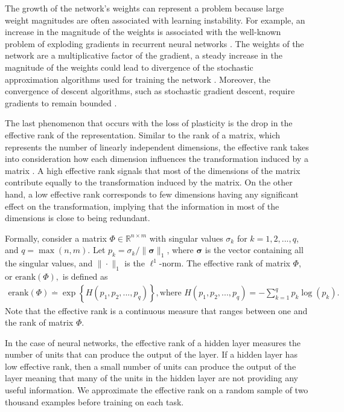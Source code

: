 \documentclass[review, number,3p]{elsarticle}
\newcommand{\custcitealp}[1]{\cite{#1}}
\begin{document}
The growth of the network's weights can represent a problem because large weight magnitudes are often associated with learning instability.
For example, an increase in the magnitude of the weights is associated with the well-known problem of exploding gradients in recurrent neural networks \custcitealp{pascanu2013difficulty}.
The weights of the network are a multiplicative factor of the gradient, a steady increase in the magnitude of the weights could lead to divergence of the stochastic approximation algorithms used for training the network \cite{philipp2017exploding, philipp2018gradients}.
Moreover, the convergence of descent algorithms, such as stochastic gradient descent, require gradients to remain bounded \cite{bertsekas2016}.


The last phenomenon that occurs with the loss of plasticity is the drop in the effective rank of the representation.
Similar to the rank of a matrix, which represents the number of linearly independent dimensions, the effective rank takes into consideration how each dimension influences the transformation induced by a matrix \cite{2007OlivierEffectiveRank}.
A high effective rank signals that most of the dimensions of the matrix contribute equally to the transformation induced by the matrix.
On the other hand, a low effective rank corresponds to few dimensions having any significant effect on the transformation, implying that the information in most of the dimensions is close to being redundant.

Formally, consider a matrix $\Phi \in \mathbb{R}^{n \times m}$ with singular values $\sigma_k$ for  $k=1, 2, ... , q$, and $q = \max(n, m)$.
Let $p_k = \sigma_k / \| \boldsymbol\sigma \|_1$, where $\boldsymbol\sigma$ is the vector containing all the singular values, and $\| \cdot \|_1$ is the $\ell^1$-norm.
The effective rank of matrix $\Phi$, or $\text{erank}(\Phi),$ is defined as
\begin{align}
    \text{erank}(\Phi) \overset{.}{=} \exp\left\{ H(p_1, p_2, ..., p_q)  \right\}, \text{where } 
    H(p_1, p_2, ..., p_q) = - \sum^q_{k=1} p_k \log(p_k).
\end{align}
%
Note that the effective rank is a continuous measure that ranges between one and the rank of matrix $\Phi$.

In the case of neural networks, the effective rank of a hidden layer measures the number of units that can produce the output of the layer.
If a hidden layer has low effective rank, then a small number of units can produce the output of the layer meaning that many of the units in the hidden layer are not providing any useful information.
We approximate the effective rank on a random sample of two thousand examples before training on each task.
\end{document}
